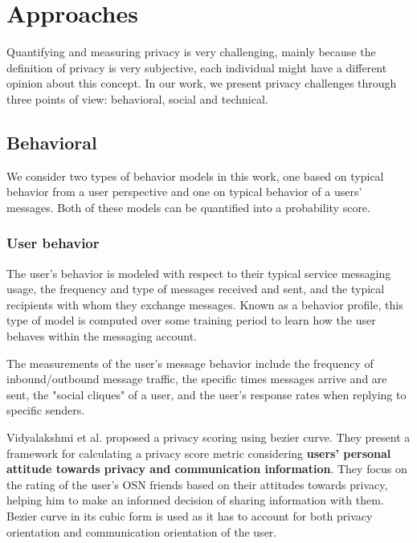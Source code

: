 \section{Approaches}

Quantifying and measuring privacy is very challenging,
	mainly because the definition of privacy is very subjective,
	each individual might have a different opinion about this concept.
In our work, we present privacy challenges through three points of view: behavioral, social and technical.

\subsection{Behavioral}

We consider two types of behavior models in this work,
	one based on typical behavior from a user perspective and one on typical behavior of a users' messages.
Both of these models can be quantified into a probability score.

\subsubsection{User behavior}

The user's behavior is modeled with respect to their typical service messaging usage,
	the frequency and type of messages received and sent,
	and the typical recipients with whom they exchange messages.
Known as a behavior profile,
	this type of model is computed over some training period to learn how the user behaves within the messaging account.

The measurements of the user's message behavior include the frequency of inbound/outbound message traffic,
	the specific times messages arrive and are sent,
	the "social cliques" of a user,
	and the user's response rates when replying to specific senders.

Vidyalakshmi et al. \cite{vidyalakshmi_privacy_2015} proposed a privacy scoring using bezier curve.
They present a framework for calculating a privacy score metric considering \textbf{users’ personal attitude towards privacy and communication information}.
They focus on the rating of the user’s OSN friends based on their attitudes towards privacy,
	helping him to make an informed decision of sharing information with them.
Bezier curve in its cubic form is used as it has to account for both privacy orientation and communication orientation of the user.

